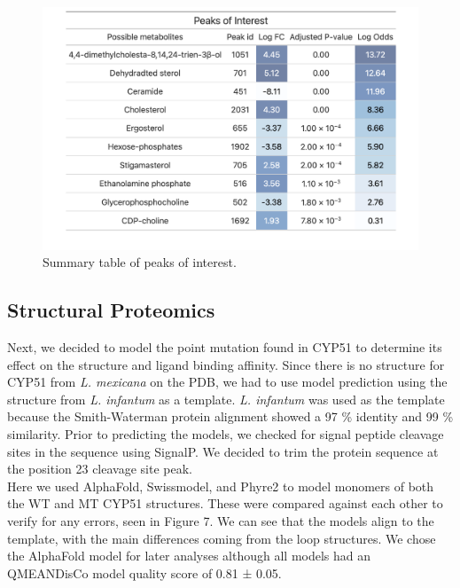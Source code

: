 \documentclass{bioinfo}
\begin{document}
\begin{figure}
\includegraphics[width=1\linewidth]{peaks of interest} \caption{Summary table of peaks of interest.}\label{fig:figure4}
\end{figure}

\subsection{Structural Proteomics}

Next, we decided to model the point mutation found in CYP51 to determine
its effect on the structure and ligand binding affinity. Since there is
no structure for CYP51 from \emph{L. mexicana} on the PDB, we had to use
model prediction using the structure from \emph{L. infantum} as a
template. \emph{L. infantum} was used as the template because the
Smith-Waterman protein alignment showed a 97 \% identity and 99 \%
similarity. Prior to predicting the models, we checked for signal
peptide cleavage sites in the sequence using SignalP. We decided to trim
the protein sequence at the position 23 cleavage site peak.\\

Here we used AlphaFold, Swissmodel, and Phyre2 to model monomers of both
the WT and MT CYP51 structures. These were compared against each other
to verify for any errors, seen in Figure 7. We can see that the models
align to the template, with the main differences coming from the loop
structures. We chose the AlphaFold model for later analyses although all
models had an QMEANDisCo model quality score of 0.81 ± 0.05.\\
\end{document}
